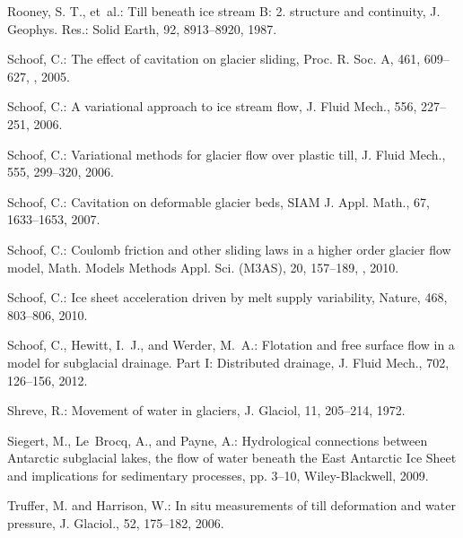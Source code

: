 \documentclass[gmd]{copernicus}   %
\begin{document}
\begin{thebibliography}{68}
Rooney, S. T., et~al.: Till beneath ice stream {B}: 2. structure and continuity,
  J. Geophys. Res.: Solid Earth, 92, 8913--8920, 1987.

Schoof, C.: The effect of cavitation on glacier sliding, Proc. R. Soc. A, 461,
  609--627, , 2005.

Schoof, C.: A variational approach to ice stream flow, J. Fluid Mech., 556,
  227--251, 2006{}.

Schoof, C.: Variational methods for glacier flow over plastic till, J. Fluid
  Mech., 555, 299--320, 2006{}.

Schoof, C.: Cavitation on deformable glacier beds, SIAM J. Appl. Math., 67,
  1633--1653, 2007.

Schoof, C.: Coulomb friction and other sliding laws in a higher order glacier
  flow model, Math. Models Methods Appl. Sci. (M3AS), 20, 157--189,
  , 2010{}.

Schoof, C.: Ice sheet acceleration driven by melt supply variability, Nature,
  468, 803--806, 2010{}.

Schoof, C., Hewitt, I.~J., and Werder, M.~A.: Flotation and free surface flow
  in a model for subglacial drainage. {P}art {I}: {D}istributed drainage, J.
  Fluid Mech., 702, 126--156, 2012.

Shreve, R.: Movement of water in glaciers, J. Glaciol, 11, 205--214, 1972.

Siegert, M., Le~Brocq, A., and Payne, A.: Hydrological connections between
  Antarctic subglacial lakes, the flow of water beneath the East Antarctic Ice
  Sheet and implications for sedimentary processes, pp. 3--10, Wiley-Blackwell,
  2009.

Truffer, M. and Harrison, W.: In situ measurements of till deformation and
  water pressure, J. Glaciol., 52, 175--182, 2006.


\end{thebibliography}
\end{document}
